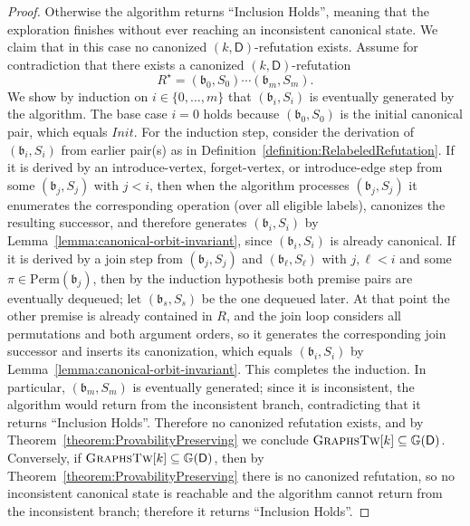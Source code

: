 \documentclass[11pt,a4paper]{article}
\newcommand{\treewidthvalue}{k}
\newcommand{\abag}{\mathfrak{b}}
\newcommand{\dpcoregraphproperty}[1]{\mathbb{G}(#1)}
\newcommand{\dpcore}{\mathsf{D}}
\newcommand{\witnessset}{S}
\newcommand{\allgraphstreewidth}[1]{\textsc{GraphsTw}[#1]}
\begin{document}
\begin{proof}
			Otherwise the algorithm returns ``Inclusion Holds'', meaning that the exploration finishes without ever reaching an inconsistent canonical state.
			We claim that in this case no canonized $(\treewidthvalue,\dpcore)$-refutation exists.
			Assume for contradiction that there exists a canonized $(\treewidthvalue,\dpcore)$-refutation
			\[
			R^\star = (\abag_0,\witnessset_0)\cdots(\abag_m,\witnessset_m).
			\]
			We show by induction on $i\in \{0,\dots,m\}$ that $(\abag_i,\witnessset_i)$ is eventually generated by the algorithm.
			The base case $i=0$ holds because $(\abag_0,\witnessset_0)$ is the initial canonical pair, which equals $Init$.
			For the induction step, consider the derivation of $(\abag_i,\witnessset_i)$ from earlier pair(s) as in Definition~\ref{definition:RelabeledRefutation}.
			If it is derived by an introduce-vertex, forget-vertex, or introduce-edge step from some $(\abag_j,\witnessset_j)$ with $j<i$, then when the algorithm processes $(\abag_j,\witnessset_j)$ it enumerates the corresponding operation (over all eligible labels), canonizes the resulting successor, and therefore generates $(\abag_i,\witnessset_i)$ by Lemma~\ref{lemma:canonical-orbit-invariant}, since $(\abag_i,\witnessset_i)$ is already canonical.
			If it is derived by a join step from $(\abag_j,\witnessset_j)$ and $(\abag_\ell,\witnessset_\ell)$ with $j,\ell<i$ and some $\pi\in\mathrm{Perm}(\abag_j)$, then by the induction hypothesis both premise pairs are eventually dequeued; let $(\abag_s,\witnessset_s)$ be the one dequeued later.
			At that point the other premise is already contained in $R$, and the join loop considers all permutations and both argument orders, so it generates the corresponding join successor and inserts its canonization, which equals $(\abag_i,\witnessset_i)$ by Lemma~\ref{lemma:canonical-orbit-invariant}.
			This completes the induction.
			In particular, $(\abag_m,\witnessset_m)$ is eventually generated; since it is inconsistent, the algorithm would return from the inconsistent branch, contradicting that it returns ``Inclusion Holds''.
			Therefore no canonized refutation exists, and by Theorem~\ref{theorem:ProvabilityPreserving} we conclude $\allgraphstreewidth{\treewidthvalue}\subseteq \dpcoregraphproperty{\dpcore}$.
			Conversely, if $\allgraphstreewidth{\treewidthvalue}\subseteq \dpcoregraphproperty{\dpcore}$, then by Theorem~\ref{theorem:ProvabilityPreserving} there is no canonized refutation, so no inconsistent canonical state is reachable and the algorithm cannot return from the inconsistent branch; therefore it returns ``Inclusion Holds''.
			\end{proof}
\end{document}
